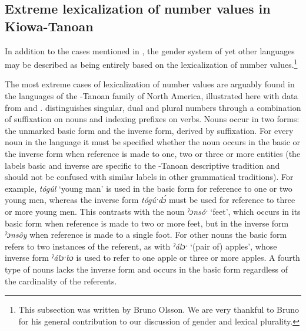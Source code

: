 \documentclass[output=collectionpaper]{langsci/langscibook}
\begin{document}
  \subsection{Extreme lexicalization of number values in Kiowa-Tanoan}

In addition to the cases mentioned in , the gender system of yet other languages may be described as being entirely based on the lexicalization of number values.\footnote{%
This subsection was written by Bruno Olsson. We are very thankful to Bruno for his general contribution to our discussion of gender and lexical plurality.
} %

The most extreme cases of lexicalization of number values are arguably found in the languages of the -Tanoan family of North America, illustrated here with  data from \cite[310]{Sutton2014} and \cite[78]{Watkins1984}.  distinguishes singular, dual and plural numbers through a combination of suffixation on nouns and indexing prefixes on verbs. Nouns occur in two forms: the unmarked basic form and the inverse form, derived by suffixation. For every noun in the language it must be specified whether the noun occurs in the basic or the inverse form when reference is made to one, two or three or more entities (the labels basic and inverse are specific to the -Tanoan descriptive tradition and should not be confused with similar labels in other grammatical traditions). For example, \textit{tógúl} `young man' is used in the basic form for reference to one or two young men, whereas the inverse form \textit{tógúˑdɔ́} must be used for reference to three or more young men. This contrasts with the noun \textit{ˀɔnsóˑ} `feet', which occurs in its basic form when reference is made to two or more feet, but in the inverse form \textit{ˀɔnsôy} when reference is made to a single foot. For other nouns the basic form refers to two instances of the referent, as with \textit{ˀálɔˑ} `(pair of) apples', whose inverse form \textit{ˀálɔˑbɔ} is used to refer to one apple or three or more apples. A fourth type of nouns lacks the inverse form and occurs in the basic form regardless of the cardinality of the referents.
\end{document}
